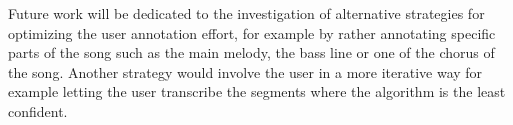 \documentclass{article}
\begin{document}
Future work will be dedicated to the investigation of alternative strategies for optimizing the user annotation effort, for example by rather annotating specific parts of the song such as the main melody, the bass line or one of the chorus of the song. Another strategy would involve the user in a more iterative way for example letting the user transcribe the segments where the algorithm is the least confident.





\end{document}
